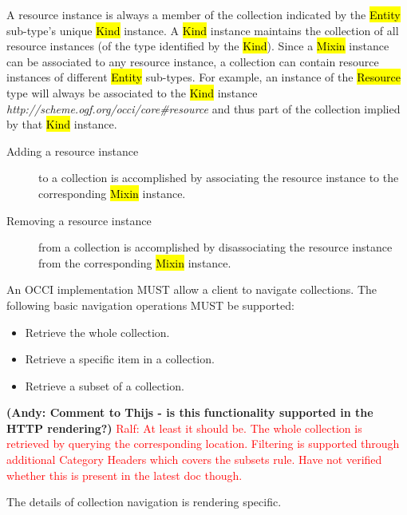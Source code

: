 \documentclass[10pt,a4paper]{article}
\newcommand{\ralf}[1]{\textcolor{red}{Ralf: #1}}
\begin{document}
A resource instance is always a member of the collection indicated by the
\hl{Entity} sub-type's unique \hl{Kind} instance. A \hl{Kind} instance maintains
the collection of all resource instances (of the type identified by the
\hl{Kind}).
%
Since a \hl{Mixin} instance can be associated to any resource instance, a
collection can contain resource instances of different \hl{Entity} sub-types.
%
For example, an instance of the \hl{Resource} type will always be associated
to the \hl{Kind} instance
\textit{http://scheme.ogf.org/occi/core\#resource} and thus part of the
collection implied by that \hl{Kind} instance.
\begin{description}
\item[Adding a resource instance] to a collection is accomplished by associating the
 resource instance to the corresponding \hl{Mixin} instance.
\item[Removing a resource instance] from a collection is accomplished by disassociating
 the resource instance from the corresponding \hl{Mixin} instance.
\end{description}
%
An OCCI implementation MUST allow a client to navigate collections. The
following basic navigation operations MUST be supported:
\begin{itemize}
\item Retrieve the whole collection.
\item Retrieve a specific item in a collection.
\item Retrieve a subset of a collection.
\end{itemize}

\textbf{(Andy: Comment to Thijs - is this functionality supported in the HTTP rendering?)}
\ralf{At least it should be. The whole collection is retrieved by querying the
corresponding location. Filtering is supported through additional Category
Headers which covers the subsets rule. Have not verified whether this is
present in the latest doc though.}

The details of collection navigation is rendering specific.
\end{document}
